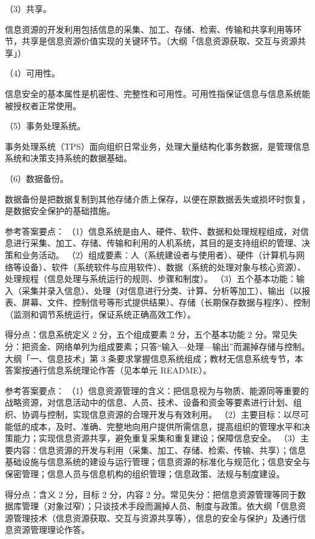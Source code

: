 \documentclass[a4paper,11pt]{article}
\begin{document}
\q （3）共享。\begin{analysis}信息资源的开发利用包括信息的采集、加工、存储、检索、传输和共享利用等环节，共享是信息资源价值实现的关键环节。（大纲「信息资源获取、交互与资源共享」）\end{analysis}

\q （4）可用性。\begin{analysis}信息安全的基本属性是机密性、完整性和可用性。可用性指保证信息与信息系统能被授权者正常使用。\end{analysis}

\q （5）事务处理系统。\begin{analysis}事务处理系统（TPS）面向组织日常业务，处理大量结构化事务数据，是管理信息系统和决策支持系统的数据基础。\end{analysis}

\q （6）数据备份。\begin{analysis}数据备份是把数据复制到其他存储介质上保存，以便在原数据丢失或损坏时恢复，是数据安全保护的基础措施。\end{analysis}


\q 参考答案要点：
（1）信息系统是由人、硬件、软件、数据和处理规程组成，对信息进行采集、加工、存储、传输和利用的人机系统，其目的是支持组织的管理、决策和业务活动。
（2）组成要素：人（系统建设者与使用者）、硬件（计算机与网络等设备）、软件（系统软件与应用软件）、数据（系统的处理对象与核心资源）、处理规程（信息处理与系统运行的规则、步骤和制度）。
（3）五个基本功能：输入（采集并录入信息）、处理（对信息进行分类、计算、分析等加工）、输出（以报表、屏幕、文件、控制信号等形式提供结果）、存储（长期保存数据与程序）、控制（监测和调节系统运行，保证系统正确高效工作）。
\begin{analysis}得分点：信息系统定义 2 分，五个组成要素 2 分，五个基本功能 2 分。常见失分：把资金、网络单列为组成要素；只答“输入—处理—输出”而漏掉存储与控制。大纲「一、信息技术」第 3 条要求掌握信息系统组成；教材无信息系统专节，本答案按通行信息系统理论作答（见本单元 README）。\end{analysis}

\q 参考答案要点：
（1）信息资源管理的含义：把信息视为与物质、能源同等重要的战略资源，对信息活动中的信息、人员、技术、设备和资金等要素进行计划、组织、协调与控制，实现信息资源的合理开发与有效利用。
（2）主要目标：以尽可能低的成本，及时、准确、完整地向用户提供所需信息，提高组织的管理水平和决策能力；实现信息资源共享，避免重复采集和重复建设；保障信息安全。
（3）主要内容：信息资源的开发与利用（采集、加工、存储、检索、传输、共享）；信息基础设施与信息系统的建设与运行管理；信息资源的标准化与规范化；信息安全与保密管理；信息人员与信息机构的组织管理；信息政策、法规与制度建设。
\begin{analysis}得分点：含义 2 分，目标 2 分，内容 2 分。常见失分：把信息资源管理等同于数据库管理（对象过窄）；只谈技术手段而漏掉人员、制度与政策。依大纲「信息资源管理技术（信息资源获取、交互与资源共享等），信息的安全与保护」及通行信息资源管理理论作答。\end{analysis}
\end{document}
